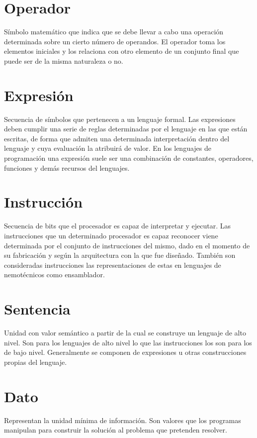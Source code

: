 \section{Operador}
Símbolo matemático que indica que se debe llevar a cabo una operación determinada sobre un cierto número de operandos. 
El operador toma los elementos iniciales y los relaciona con otro elemento de un conjunto final que puede ser de la misma naturaleza o no.

\section{Expresión}
Secuencia de símbolos que pertenecen a un lenguaje formal. Las expresiones deben cumplir una serie de reglas determinadas por el lenguaje 
en las que están escritas, de forma que admiten una determinada interpretación dentro del lenguaje y cuya evaluación la atribuirá de valor. 
En los lenguajes de programación una expresión suele ser una combinación de constantes, operadores, funciones y demás recursos del lenguajes. 

\section{Instrucción}
Secuencia de bits que el procesador es capaz de interpretar y ejecutar. Las instrucciones que un determinado procesador es capaz reconocer 
viene determinada por el conjunto de instrucciones del mismo, dado en el momento de su fabricación y según la arquitectura con la que fue diseñado. 
También son consideradas instrucciones las representaciones de estas en lenguajes de nemotécnicos como ensamblador.
 
\section{Sentencia}
Unidad con valor semántico a partir de la cual se construye un lenguaje de alto nivel. Son para los lenguajes de alto nivel lo que las instrucciones
los son para los de bajo nivel. Generalmente se componen de expresiones u otras construcciones propias del lenguaje.

\section{Dato}
Representan la unidad mínima de información. Son valores que los programas manipulan para construir la solución al problema que pretenden resolver.

